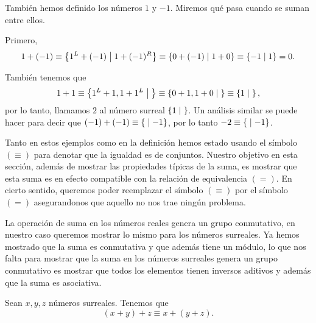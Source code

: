     \begin{example}
        Tambi\'en hemos definido los n\'umeros $1$ y $-1$. Miremos qu\'e pasa cuando se suman entre ellos.

        Primero,
        \[
            1 + (-1) \equiv \left\{1^L + (-1)\;\middle|\; 1+(-1)^R\right\} \equiv \left\{0+(-1)\;\middle|\; 1+0\right\} \equiv \left\{-1\;\middle|\; 1\right\} = 0.
        \]

        Tambi\'en tenemos que
        \[
            1 + 1 \equiv \left\{1^L+1, 1+1^L\;\middle|\; \right\} \equiv \left\{0+1,1+0\;\middle|\; \right\} \equiv \left\{1\;\middle|\; \right\},
        \]
        por lo tanto, llamamos $2$ al n\'umero surreal $\left\{1\;\middle|\; \right\}$. Un an\'alisis similar se puede hacer para decir que $(-1)+(-1) \equiv \left\{\;\middle|\; -1\right\}$, por lo tanto $-2 \equiv \left\{\;\middle|\; -1\right\}$.
    \end{example}

    Tanto en estos ejemplos como en la definici\'on hemos estado usando el s\'imbolo $(\equiv)$ para denotar que la igualdad es de conjuntos. Nuestro objetivo en esta secci\'on, adem\'as de mostrar las propiedades t\'ipicas de la suma, es mostrar que esta suma es en efecto compatible con la relaci\'on de equivalencia $(=)$. En cierto sentido, queremos poder reemplazar el s\'imbolo $(\equiv)$ por el s\'imbolo $(=)$ asegurandonos que aquello no nos trae ning\'un problema.

    La operaci\'on de suma en los n\'umeros reales genera un grupo conmutativo, en nuestro caso queremos mostrar lo mismo para los n\'umeros surreales. Ya hemos mostrado que la suma es conmutativa y que adem\'as tiene un m\'odulo, lo que nos falta para mostrar que la suma en los n\'umeros surreales genera un grupo conmutativo es mostrar que todos los elementos tienen inversos aditivos y adem\'as que la suma es asociativa.

    \begin{theorem}
        Sean $x, y, z$ n\'umeros surreales. Tenemos que
        \[
            (x+y)+z \equiv x+(y+z).
        \]
    \end{theorem}

